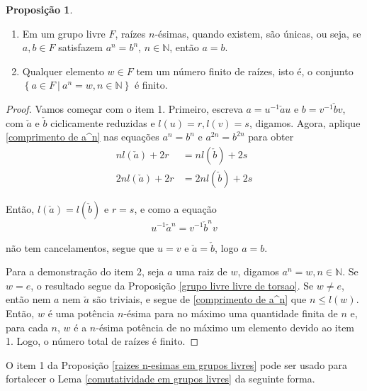 \documentclass[a4paper,portuguese,11pt,twoside, leqno]{book}
\theoremstyle{definition}
\newtheorem{prop}{Proposição}[section]
\begin{document}
	\begin{prop}
		\label{raizes n-esimas em grupos livres}
		\begin{enumerate}
			\item Em um grupo livre $F$, raízes $n$-ésimas, quando existem, são únicas, ou seja, se $a,b\in F$ satisfazem $a^n = b^n$, $n\in\mathbb{N}$, então $a = b$.
			\item Qualquer elemento $w\in F$ tem um número finito de raízes, isto é, o conjunto $\left\{ a\in F \ \vert \ a^n = w, n\in\mathbb{N} \right\}$ é finito.
		\end{enumerate}
	\end{prop}
	\begin{proof} Vamos começar com o item 1. Primeiro, escreva $a = u^{-1}\check{a}u$ e $b = v^{-1}\check{b}v$, com $\check{a}$ e $\check{b}$ ciclicamente reduzidas e $l(u) = r, l(v) = s$, digamos. Agora, aplique \eqref{comprimento de a^n} nas equações $a^n = b^n$ e $a^{2n} = b^{2n}$ para obter
		\begin{align*}
		nl(\check{a}) + 2r &= nl(\check{b}) + 2s \\
		2nl(\check{a}) + 2r &= 2nl(\check{b}) + 2s
		\end{align*}
		\par\vspace{0.3cm} Então, $l(\check{a}) = l(\check{b})$ e $r=s$, e como a equação
		\begin{equation*}
		u^{-1}\check{a}^n = v^{-1}\check{b}^nv
		\end{equation*}
		\par\vspace{0.3cm} não tem cancelamentos, segue que $u = v$ e $\check{a} = \check{b}$, logo $a=b$.
		\par\vspace{0.3cm} Para a demonstração do item 2, seja $a$ uma raiz de $w$, digamos $a^n = w, n\in\mathbb{N}$. Se $w = e$, o resultado segue da Proposição \eqref{grupo livre livre de torsao}. Se $w\neq e$, então nem $a$ nem $\check{a}$ são triviais, e segue de \eqref{comprimento de a^n} que $n\leq l(w)$. Então, $w$ é uma potência $n$-ésima para no máximo uma quantidade finita de $n$ e, para cada $n$, $w$ é a $n$-ésima potência de no máximo um elemento devido ao item 1. Logo, o número total de raízes é finito.
	\end{proof}
	\par\vspace{0.3cm} O item 1 da Proposição \eqref{raizes n-esimas em grupos livres} pode ser usado para fortalecer o Lema \eqref{comutatividade em grupos livres} da seguinte forma.
\end{document}
